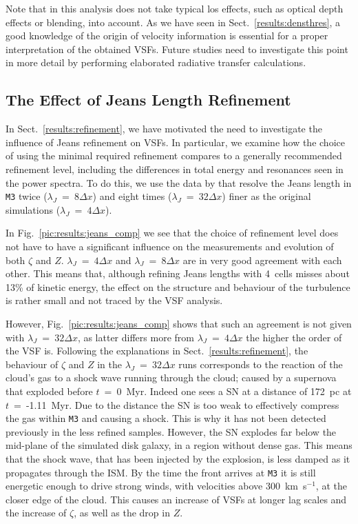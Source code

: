Note that in this analysis does not take typical los effects, such as optical depth effects or blending, into account. 
As we have seen in Sect.~\ref{results:densthres}, a good knowledge of the origin of velocity information is essential for a proper interpretation of the obtained VSFs.
Future studies need to investigate this point in more detail by performing elaborated radiative transfer calculations. 



\subsection{The Effect of Jeans Length Refinement}\label{discussion:refinement}

In Sect.~\ref{results:refinement}, we have motivated the need to investigate the influence of Jeans refinement on VSFs.
In particular, we examine how the choice of using the minimal required refinement compares to a generally recommended refinement level, including the differences in total energy and resonances seen in the power spectra. 
To do this, we use the data by  that resolve the Jeans length in \texttt{M3} twice ($\lambda_J$~=~$8\Delta{}x$) and eight times ($\lambda_J$~=~$32\Delta{}x$) finer as the original simulations ($\lambda_J$~=~$4\Delta{}x$).

In Fig.~\ref{pic:results:jeans_comp} we see that the choice of refinement level does not have to have a significant influence on the measurements and evolution of both $\zeta$ and $Z$. 
$\lambda_J$~=~$4\Delta{}x$ and $\lambda_J$~=~$8\Delta{}x$ are in very good agreement with each other.
This means that, although refining Jeans lengths with 4~cells misses about 13\% of kinetic energy, the effect on the structure and behaviour of the turbulence is rather small and not traced by the VSF analysis.

However, Fig.~\ref{pic:results:jeans_comp} shows that such an agreement is not given with $\lambda_J$~=~$32\Delta{}x$, as latter differs more from $\lambda_J$~=~$4\Delta{}x$ the higher the order of the VSF is.
Following the explanations in Sect.~\ref{results:refinement}, the behaviour of $\zeta$ and $Z$ in the $\lambda_J$~=~$32\Delta{}x$ runs corresponds to the reaction of the cloud's gas to a shock wave running through the cloud; caused by a supernova that exploded before $t$~=~0~Myr. 
Indeed one sees a SN at a distance of 172~pc at $t$~=~-1.11~Myr. 
Due to the distance the SN is too weak to effectively compress the gas within \texttt{M3} and causing a shock.
This is why it has not been detected previously in the less refined samples.
However, the SN explodes far below the mid-plane of the simulated disk galaxy, in a region without dense gas.
This means that the shock wave, that has been injected by the explosion, is less damped as it propagates through the ISM. 
By the time the front arrives at \texttt{M3} it is still energetic enough to drive strong winds, with velocities above 300~km~s$^{-1}$, at the closer edge of the cloud. 
This causes an increase of VSFs at longer lag scales and the increase of $\zeta$, as well as the drop in $Z$.

